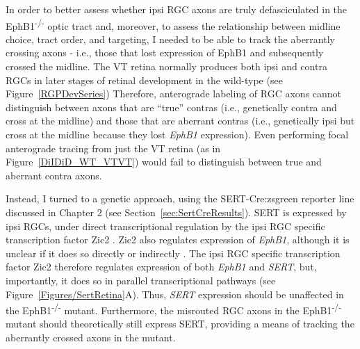 \label{sec:EphB1Sert}
In order to better assess whether ipsi RGC axons are truly defasciculated in the EphB1\textsuperscript{-/-} optic tract and, moreover, to assess the relationship between midline choice, tract order, and targeting, I needed to be able to track the aberrantly crossing axons - i.e., those that lost expression of EphB1 and subsequently crossed the midline.
The VT retina normally produces both ipsi and contra RGCs in later stages of retinal development in the wild-type (see Figure~\ref{RGPDevSeries})
Therefore, anterograde labeling of RGC axons cannot distinguish between axons that are ``true'' contras (i.e., genetically contra and cross at the midline) and those that are aberrant contras (i.e., genetically ipsi but cross at the midline because they lost \emph{EphB1} expression).
Even performing focal anterograde tracing from just the VT retina (as in Figure~\ref{DiIDiD_WT_VTVT}) would fail to distinguish between true and aberrant contra axons.

Instead, I turned to a genetic approach, using the SERT-Cre:zsgreen reporter line discussed in Chapter 2 (see Section~\ref{sec:SertCreResults}).
SERT is expressed by ipsi RGCs, under direct transcriptional regulation by the ipsi RGC specific transcription factor Zic2 \cite{garcia2010zic2}.
Zic2 also regulates expression of \emph{EphB1}, although it is unclear if it does so directly or indirectly \cite{garcia2010zic2}.
The ipsi RGC specific transcription factor Zic2 therefore regulates expression of both \emph{EphB1} and \emph{SERT}, but, importantly, it does so in parallel transcriptional pathways (see Figure~\ref{Figures/SertRetina}A).
Thus, \emph{SERT} expression should be unaffected in the EphB1\textsuperscript{-/-} mutant.
Furthermore, the misrouted RGC axons in the EphB1\textsuperscript{-/-} mutant should theoretically still express SERT, providing a means of tracking the aberrantly crossed axons in the mutant.

